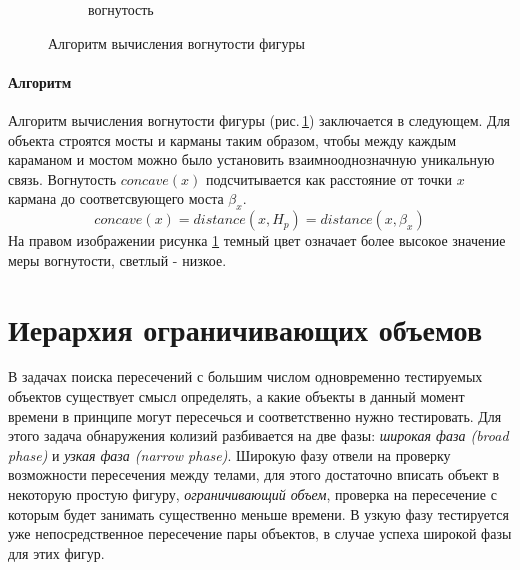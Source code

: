 \documentclass[11pt,a4paper]{extarticle}
\begin{document}
\begin{figure}[ht]
\begin{subfigure}{2in}
					\caption*{вогнутость}
				\end{subfigure}
				\caption{Алгоритм вычисления вогнутости фигуры}
				\label{teeth}
			\end{figure}
			\paragraph{Алгоритм} 
				Алгоритм вычисления вогнутости фигуры (рис.\,\ref{teeth}) заключается в следующем.
				Для объекта строятся мосты и карманы таким образом, чтобы между каждым караманом и мостом можно было установить взаимнооднозначную уникальную связь.
				Вогнутость $concave(x)$ подсчитывается как расстояние от точки $x$ кармана до соответсвующего моста $\beta_x$.
				$$concave(x) = distance(x, H_p) = distance(x, \beta_x)$$
				На правом изображении рисунка \ref{teeth} темный цвет означает более высокое значение меры вогнутости, светлый - низкое. 
	\section{Иерархия ограничивающих объемов}
		В задачах поиска пересечений с большим числом одновременно тестируемых объектов существует смысл определять, а какие объекты в данный момент времени в принципе могут пересечься и соответственно нужно тестировать.
		Для этого задача обнаружения колизий разбивается на две фазы: \emph{широкая фаза (broad phase)} и \emph{узкая фаза (narrow phase)}.
		Широкую фазу отвели на проверку возможности пересечения между телами, для этого достаточно вписать объект в некоторую простую фигуру, \emph{ограничивающий объем}, проверка на пересечение с которым будет занимать существенно меньше времени.
		В узкую фазу тестируется уже непосредственное пересечение пары объектов, в случае успеха широкой фазы для этих фигур.
\end{document}
